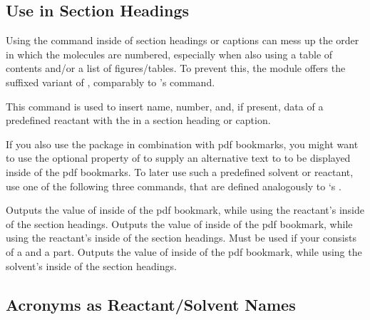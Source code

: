 \documentclass{chemmacros-manual}
\begin{document}
\subsection{Use in Section Headings}\label{sec:reactants-in-headings}

Using the  command inside of section headings or captions can mess up the 
order in which the molecules are numbered, especially when also using a table of contents 
and/or a list of figures/tables. To prevent this, the  module offers
the \code{+} suffixed variant of , comparably to 's  
command.

\begin{commands}
  This command is used to insert name, number, and, if present, data of a predefined 
  reactant with the  in a section heading or caption.
\end{commands}

If you also use the  package in combination with \ac{pdf} bookmarks, you might 
want to use the optional  property of  to supply 
an alternative text to  to be displayed inside of the \ac{pdf} bookmarks. To later 
use such a predefined solvent or reactant, use one of the following three commands, that are 
defined analogously to `s .

\begin{commands}
  Outputs the value of  inside of the \ac{pdf} bookmark, while using the reactant's 
   inside of the  section headings. 
  Outputs the value of  inside of the \ac{pdf} bookmark, while using the reactant's 
   inside of the  section headings. Must be used if your  consists of a  and a    part. 
  Outputs the value of  inside of the \ac{pdf} bookmark, while using the solvent's 
   inside of the  section headings.
\end{commands}


\subsection{Acronyms as Reactant/Solvent Names}\label{sec:acronyms-in-reactants}
\end{document}
